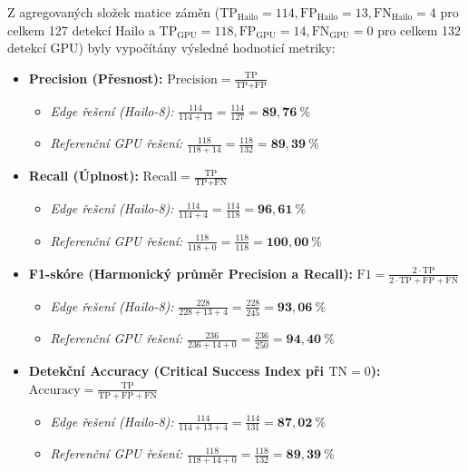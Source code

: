 \documentclass[male,czech,api_bc]{kitheses}
\begin{document}
Z agregovaných složek matice záměn ($\text{TP}_{\text{Hailo}}=114, \text{FP}_{\text{Hailo}}=13, \text{FN}_{\text{Hailo}}=4$ pro celkem 127 detekcí Hailo a $\text{TP}_{\text{GPU}}=118, \text{FP}_{\text{GPU}}=14, \text{FN}_{\text{GPU}}=0$ pro celkem 132 detekcí GPU) byly vypočítány výsledné hodnoticí metriky:
\begin{itemize}
    \item \textbf{Precision (Přesnost):} $\text{Precision} = \frac{\text{TP}}{\text{TP} + \text{FP}}$
    \begin{itemize}
        \item \textit{Edge řešení (Hailo-8):} $\frac{114}{114 + 13} = \frac{114}{127} = \mathbf{89{,}76~\%}$
        \item \textit{Referenční GPU řešení:} $\frac{118}{118 + 14} = \frac{118}{132} = \mathbf{89{,}39~\%}$
    \end{itemize}
    \item \textbf{Recall (Úplnost):} $\text{Recall} = \frac{\text{TP}}{\text{TP} + \text{FN}}$
    \begin{itemize}
        \item \textit{Edge řešení (Hailo-8):} $\frac{114}{114 + 4} = \frac{114}{118} = \mathbf{96{,}61~\%}$
        \item \textit{Referenční GPU řešení:} $\frac{118}{118 + 0} = \frac{118}{118} = \mathbf{100{,}00~\%}$
    \end{itemize}
    \item \textbf{F1-skóre (Harmonický průměr Precision a Recall):} $\text{F1} = \frac{2 \cdot \text{TP}}{2 \cdot \text{TP} + \text{FP} + \text{FN}}$
    \begin{itemize}
        \item \textit{Edge řešení (Hailo-8):} $\frac{228}{228 + 13 + 4} = \frac{228}{245} = \mathbf{93{,}06~\%}$
        \item \textit{Referenční GPU řešení:} $\frac{236}{236 + 14 + 0} = \frac{236}{250} = \mathbf{94{,}40~\%}$
    \end{itemize}
    \item \textbf{Detekční Accuracy (Critical Success Index při $\text{TN}=0$):} $\text{Accuracy} = \frac{\text{TP}}{\text{TP} + \text{FP} + \text{FN}}$
    \begin{itemize}
        \item \textit{Edge řešení (Hailo-8):} $\frac{114}{114 + 13 + 4} = \frac{114}{131} = \mathbf{87{,}02~\%}$
        \item \textit{Referenční GPU řešení:} $\frac{118}{118 + 14 + 0} = \frac{118}{132} = \mathbf{89{,}39~\%}$
    \end{itemize}
\end{itemize}
\end{document}
